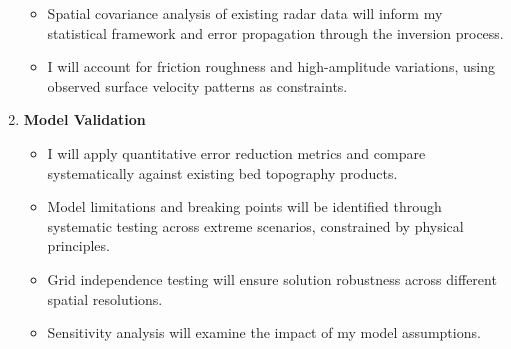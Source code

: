 \begin{enumerate}
\begin{itemize}
    \item Spatial covariance analysis of existing radar data will inform my statistical framework and error propagation through the inversion process.
    
    \item I will account for friction roughness and high-amplitude variations, using observed surface velocity patterns as constraints.
    \end{itemize}

\item\textbf{Model Validation}
    \begin{itemize}
    \item I will apply quantitative error reduction metrics and compare systematically against existing bed topography products.
    
    \item Model limitations and breaking points will be identified through systematic testing across extreme scenarios, constrained by physical principles.
    
    \item Grid independence testing will ensure solution robustness across different spatial resolutions.
    
    \item Sensitivity analysis will examine the impact of my model assumptions.
    \end{itemize}
\end{enumerate}





